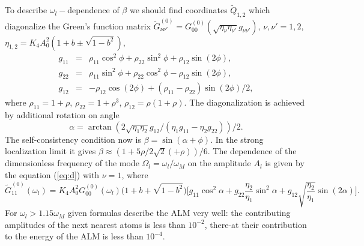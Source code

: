 To describe $\omega_l-$dependence of $\beta$ we should find coordinates 
$\tilde{Q}_{1,2}$ which diagonalize the Green's function matrix 
$\check{G}^{(0)}_{\nu \nu'}= 
G^{(0)}_{00}(\sqrt{\eta_{\nu}\eta_{\nu'}}g_{\nu\nu'})$, $\nu, \nu' =1,2$,
$\eta_{1,2} =K_4 A_0^2 (1+b \pm \sqrt{1-b^2})$,
\begin{eqnarray}
g_{11} &=&\rho_{11}\cos^2{\phi} +
\rho_{22}\sin^2{\phi} + \rho_{12} \sin{(2\phi)}, \nonumber \\
g_{22} &=&\rho_{11}\sin^2{\phi} +
\rho_{22}\cos^2{\phi} - \rho_{12} \sin{(2\phi)}, \nonumber \\
g_{12} &=&-\rho_{12} \cos{(2\phi)} + (\rho_{11}- \rho_{22})
\sin{(2\phi)}/2,  \nonumber
\end{eqnarray}
where
$\rho_{11} = 1+\rho$, $\rho_{22} = 1+\rho^3$, $\rho_{12}=\rho(1+\rho)$.
The diagonalization is achieved by additional rotation on angle
\begin{equation}
\alpha=\arctan{( 2\sqrt{\eta_1 \eta_2} g_{12}
/(\eta_1 g_{11}-\eta_2 g_{22}))}/2.
\label{eq:f}
\end{equation}
The self-consistency condition now is 
$\beta = \sin{(\alpha +\phi)}$.
In the strong localization limit it gives     
$\beta \approx (1+5\rho/2\sqrt{2}(+\rho))/6$.
The dependence of the dimensionless frequency of the mode 
$\Omega_l = \omega_l/\omega_M$ on the amplitude $A_l$ is given by the equation
(\ref{eq:d}) with $\nu =1$, where
\begin{equation} 
\tilde{G}^{(0)}_{11}(\omega_l)= K_4 A_0^2G^{(0)}_{00}(\omega_l) 
{\Big (}1+b + \sqrt{1-b^2}{\Big )}
{\Big [}g_{11}\cos^2{\alpha} + g_{22} \frac{\eta_2}{\eta_1}\sin^2{\alpha} + 
g_{12}\sqrt{\frac{\eta_2}{\eta_1}}\sin{(2\alpha)}{\Big ]}. 
\end{equation}
For $\omega_l > 1.15 \omega_M$ given formulas describe the ALM
very well: the contributing amplitudes of the next nearest atoms is less 
than $10^{-2}$, there-at their contribution to the energy of the ALM is less 
than $10^{-4}$. 

